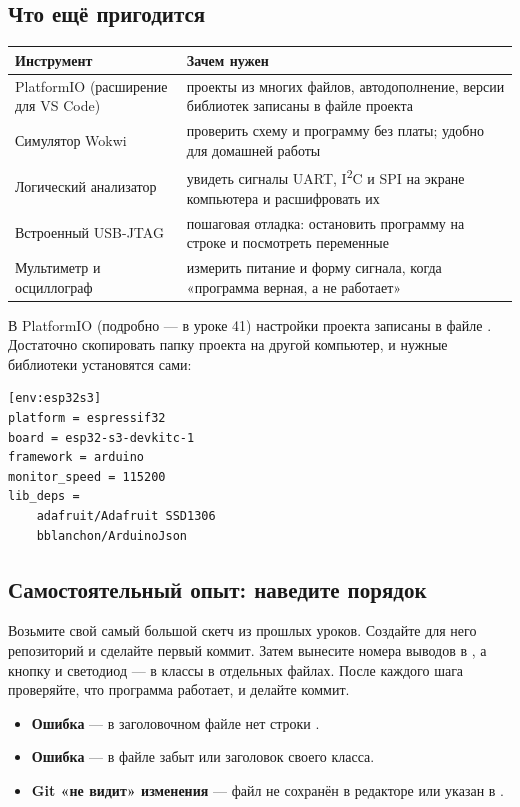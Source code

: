 \subsection{Что ещё пригодится}

\begin{center}\small
\begin{tabularx}{\textwidth}{@{}l X@{}}
\toprule
Инструмент & Зачем нужен \\
\midrule
PlatformIO (расширение для VS Code) & проекты из многих файлов, автодополнение, версии библиотек записаны в файле проекта \\
Симулятор Wokwi & проверить схему и программу без платы; удобно для домашней работы \\
Логический анализатор & увидеть сигналы UART, I\textsuperscript{2}C и SPI на экране компьютера и расшифровать их \\
Встроенный USB-JTAG & пошаговая отладка: остановить программу на строке и посмотреть переменные \\
Мультиметр и осциллограф & измерить питание и форму сигнала, когда «программа верная, а не работает» \\
\bottomrule
\end{tabularx}
\end{center}

В PlatformIO (подробно --- в уроке 41) настройки проекта записаны в файле . Достаточно скопировать папку
проекта на другой компьютер, и нужные библиотеки установятся сами:

\begin{Verbatim}[fontsize=\small,bgcolor=codebg]
[env:esp32s3]
platform = espressif32
board = esp32-s3-devkitc-1
framework = arduino
monitor_speed = 115200
lib_deps =
    adafruit/Adafruit SSD1306
    bblanchon/ArduinoJson
\end{Verbatim}

\subsection{Самостоятельный опыт: наведите порядок}

Возьмите свой самый большой скетч из прошлых уроков. Создайте для него репозиторий и сделайте первый
коммит. Затем вынесите номера выводов в , а кнопку и светодиод --- в классы в отдельных
файлах. После каждого шага проверяйте, что программа работает, и делайте коммит.

\begin{trouble}
\begin{itemize}[leftmargin=*]
  \item \textbf{Ошибка } --- в заголовочном файле нет строки .
  \item \textbf{Ошибка } --- в файле  забыт 
        или заголовок своего класса.
  \item \textbf{Git «не видит» изменения} --- файл не сохранён в редакторе или указан в .
\end{itemize}
\end{trouble}

